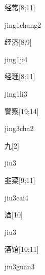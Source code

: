 \begin{verbete}{经常}[8;11]
\begin{pronuncia}{jing1chang2}
\end{pronuncia}
\end{verbete}

\begin{verbete}[jing1ji4]{经济}[8;9]
\begin{pronuncia}{jing1ji4}
\end{pronuncia}
\end{verbete}

\begin{verbete}[jing1li3]{经理}[8;11]
\begin{pronuncia}{jing1li3}
\end{pronuncia}
\end{verbete}

\begin{verbete}{警察}[19;14]
\begin{pronuncia}{jing3cha2}
\end{pronuncia}
\end{verbete}

\begin{verbete}[jiu3]{九}[2]
\begin{pronuncia}{jiu3}
\end{pronuncia}
\end{verbete}

\begin{verbete}{韭菜}[9;11]
\begin{pronuncia}{jiu3cai4}
\end{pronuncia}
\end{verbete}

\begin{verbete}[jiu3]{酒}[10]
\begin{pronuncia}{jiu3}
\end{pronuncia}
\end{verbete}

\begin{verbete}{酒馆}[10;11]
\begin{pronuncia}{jiu3guan3}
\end{pronuncia}
\end{verbete}

